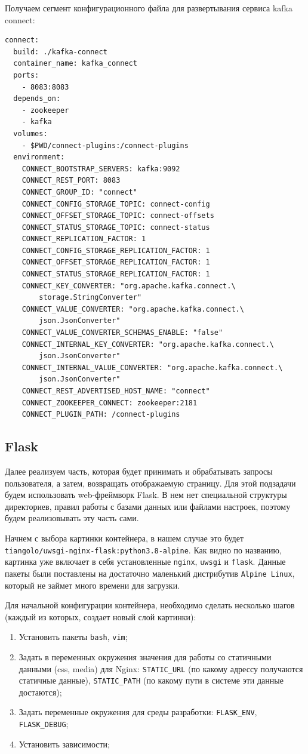 Получаем сегмент конфигурационного файла для развертывания сервиса kafka
connect:
\begin{verbatim}
connect:
  build: ./kafka-connect
  container_name: kafka_connect
  ports:
    - 8083:8083
  depends_on:
    - zookeeper
    - kafka
  volumes:
    - $PWD/connect-plugins:/connect-plugins
  environment:
    CONNECT_BOOTSTRAP_SERVERS: kafka:9092
    CONNECT_REST_PORT: 8083
    CONNECT_GROUP_ID: "connect"
    CONNECT_CONFIG_STORAGE_TOPIC: connect-config
    CONNECT_OFFSET_STORAGE_TOPIC: connect-offsets
    CONNECT_STATUS_STORAGE_TOPIC: connect-status
    CONNECT_REPLICATION_FACTOR: 1
    CONNECT_CONFIG_STORAGE_REPLICATION_FACTOR: 1
    CONNECT_OFFSET_STORAGE_REPLICATION_FACTOR: 1
    CONNECT_STATUS_STORAGE_REPLICATION_FACTOR: 1
    CONNECT_KEY_CONVERTER: "org.apache.kafka.connect.\
        storage.StringConverter"
    CONNECT_VALUE_CONVERTER: "org.apache.kafka.connect.\
        json.JsonConverter"
    CONNECT_VALUE_CONVERTER_SCHEMAS_ENABLE: "false"
    CONNECT_INTERNAL_KEY_CONVERTER: "org.apache.kafka.connect.\
        json.JsonConverter"
    CONNECT_INTERNAL_VALUE_CONVERTER: "org.apache.kafka.connect.\
        json.JsonConverter"
    CONNECT_REST_ADVERTISED_HOST_NAME: "connect"
    CONNECT_ZOOKEEPER_CONNECT: zookeeper:2181
    CONNECT_PLUGIN_PATH: /connect-plugins
\end{verbatim}


\subsection{Flask}
Далее реализуем часть, которая будет принимать и обрабатывать запросы
пользователя, а затем, возвращать отображаемую страницу. Для этой подзадачи
будем использовать web-фреймворк Flask. В нем нет специальной структуры
директориев, правил работы с базами данных или файлами настроек, поэтому будем
реализовывать эту часть сами.

Начнем с выбора картинки контейнера, в нашем случае это будет
\verb|tiangolo/uwsgi-nginx-flask:python3.8-alpine|. Как видно по названию,
картинка уже включает в себя установленные \verb|nginx|, \verb|uwsgi| и
\verb|flask|. Данные пакеты были поставлены на достаточно маленький дистрибутив
\verb|Alpine Linux|, который не займет много времени для загрузки.

Для начальной конфигурации контейнера, необходимо сделать несколько шагов
(каждый из которых, создает новый слой картинки):
\begin{enumerate}[label=\arabic*.]
    \item Установить пакеты \verb|bash|, \verb|vim|;
    \item Задать в переменных окружения значения для работы со статичными
        данными (css, media) для Nginx: \verb|STATIC_URL| (по какому адрессу
        получаются статичные данные), \verb|STATIC_PATH| (по какому пути в
        системе эти данные достаются);
    \item Задать переменные окружения для среды разработки: \verb|FLASK_ENV|, \verb|FLASK_DEBUG|;
    \item Установить зависимости;
\end{enumerate}

